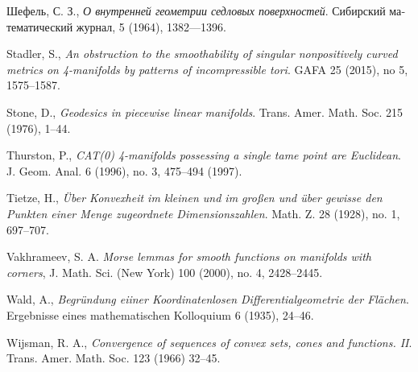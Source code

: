 \begin{thebibliography}{52}
\begin{otherlanguage}{russian}
Шефель, С. З., 
\textit{О внутренней геометрии седловых поверхностей}.
Сибирский математический журнал, 5 (1964), 1382---1396.
\end{otherlanguage}

Stadler, S.,
\textit{An obstruction to the smoothability of singular nonpositively curved metrics on 4-manifolds by patterns of incompressible tori}.
GAFA
25 (2015), 
no 5, 
1575--1587.

Stone, D.,
\textit{Geodesics in piecewise linear manifolds}.
Trans. Amer. Math. Soc. 
215 
(1976), 
1--44.

 Thurston, P.,
\textit{CAT(0) 4-manifolds possessing a single tame point are Euclidean}. 
J. Geom. Anal. 
6 (1996), 
no. 3, 
475--494 (1997). 

 Tietze, H.,
\emph{\"Uber Konvexheit im kleinen und im gro\ss{}en und \"uber gewisse den Punkten einer Menge zugeordnete Dimensionszahlen}.
Math. Z. 28 (1928), no. 1, 697--707.


Vakhrameev, S. A.
\emph{Morse lemmas for smooth functions on manifolds with corners},
J. Math. Sci. (New York)
100 (2000), no. 4, 2428--2445.

 Wald, A., \textit{Begr\"undung eiiner Koordinatenlosen Differentialgeometrie der Fl\"achen}.
Ergebnisse eines mathematischen Kolloquium
6  (1935), 24--46.

 Wijsman, R. A., 
\textit{Convergence of sequences of convex sets, cones and functions. II}. 
Trans. Amer. Math. Soc. 
123 (1966) 32--45.


\end{thebibliography}
